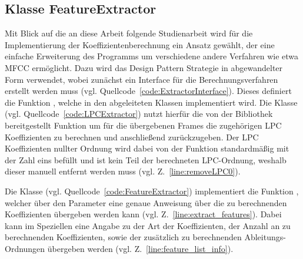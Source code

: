 \subsection{Klasse FeatureExtractor}
Mit Blick auf die an diese Arbeit folgende Studienarbeit wird für die Implementierung der Koeffizientenberechnung ein Ansatz gewählt, der eine einfache Erweiterung des Programms um verschiedene andere Verfahren wie etwa \ac{MFCC} ermöglicht.
Dazu wird das Design Pattern Strategie in abgewandelter Form verwendet, wobei zunächst ein Interface für die Berechnungsverfahren erstellt werden muss (vgl. Quellcode~\ref{code:ExtractorInterface}).
Dieses definiert die Funktion , welche in den abgeleiteten Klassen implementiert wird.
Die Klasse  (vgl. Quellcode~\ref{code:LPCExtractor}) nutzt hierfür die von der Bibliothek  bereitgestellt Funktion  um für die übergebenen Frames die zugehörigen \ac{LPC} Koeffizienten zu berechnen und anschließend zurückzugeben.
Der \ac{LPC} Koeffizienten nullter Ordnung wird dabei von der Funktion standardmäßig mit der Zahl eins befüllt und ist kein Teil der berechneten \ac{LPC}-Ordnung, weshalb dieser manuell entfernt werden muss (vgl. Z.~\ref{line:removeLPC0}).

Die Klasse  (vgl. Quellcode~\ref{code:FeatureExtractor}) implementiert die Funktion , welcher über den Parameter  eine genaue Anweisung über die zu berechnenden Koeffizienten übergeben werden kann (vgl. Z.~\ref{line:extract_features}).
Dabei kann im Speziellen eine Angabe zu der Art der Koeffizienten, der Anzahl an zu berechnenden Koeffizienten, sowie der zusätzlich zu berechnenden Ableitungs-Ordnungen übergeben werden (vgl. Z.~\ref{line:feature_list_info}).